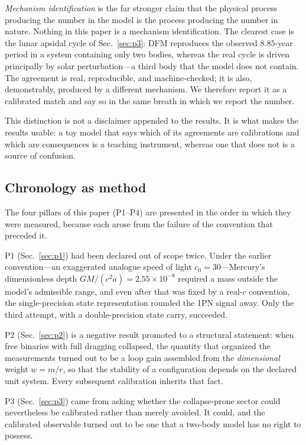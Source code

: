 \documentclass[aps,reprint,amsmath,amssymb,nofootinbib,superscriptaddress,floatfix]{revtex4-2}
\begin{document}
\emph{Mechanism identification} is the far stronger claim that the
physical process producing the number in the model is the process
producing the number in nature.
Nothing in this paper is a mechanism identification.
The clearest case is the lunar apsidal cycle of
Sec.~\ref{sec:p3}: DFM reproduces the observed $8.85$-year period in a
system containing only two bodies, whereas the real cycle is driven
principally by solar perturbation---a third body that the model does
not contain.
The agreement is real, reproducible, and machine-checked; it is also,
demonstrably, produced by a different mechanism.
We therefore report it as a calibrated match and say so in the same
breath in which we report the number.

This distinction is not a disclaimer appended to the results.
It is what makes the results usable: a toy model that says which of
its agreements are calibrations and which are consequences is a
teaching instrument, whereas one that does not is a source of
confusion.

\subsection{Chronology as method}
\label{sec:chronology}

The four pillars of this paper (P1--P4) are presented in the order in
which they were measured, because each arose from the failure of the
convention that preceded it.

P1 (Sec.~\ref{sec:p1}) had been declared out of scope twice.
Under the earlier convention---an exaggerated analogue speed of light
$c_0=30$---Mercury's dimensionless depth $GM/(c^{2}a)=2.55\times
10^{-8}$ required a mass outside the model's admissible range, and
even after that was fixed by a real-$c$ convention, the single-precision
state representation rounded the 1PN signal away.
Only the third attempt, with a double-precision state carry, succeeded.

P2 (Sec.~\ref{sec:p2}) is a negative result promoted to a structural
statement: when free binaries with full dragging collapsed, the
quantity that organized the measurements turned out to be a loop gain
assembled from the \emph{dimensional} weight $w=m/r$, so that the
stability of a configuration depends on the declared unit system.
Every subsequent calibration inherits that fact.

P3 (Sec.~\ref{sec:p3}) came from asking whether the collapse-prone
sector could nevertheless be calibrated rather than merely avoided.
It could, and the calibrated observable turned out to be one that a
two-body model has no right to possess.
\end{document}
